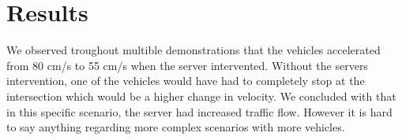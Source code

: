 \section{Results}

We observed troughout multible demonstrations that the vehicles accelerated from 80 cm/s to 55 cm/s when the server intervented. Without the servers intervention, one of the vehicles would have had to completely stop at the intersection which would be a higher change in velocity. We concluded with that in this specific scenario, the server had increased traffic flow. However it is hard to say anything regarding more complex scenarios with more vehicles.


